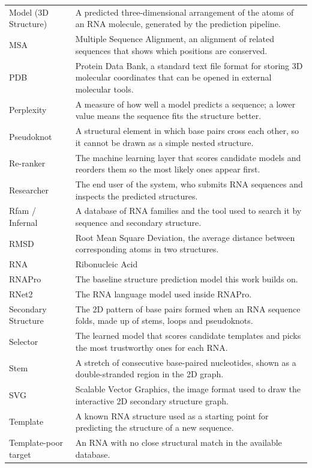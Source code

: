 \documentclass{FastFyp}
\begin{document}
\begin{longtable}{p{} p{}}
Model (3D Structure) & A predicted three-dimensional arrangement of the atoms of an RNA molecule, generated by the prediction pipeline.\\
MSA & Multiple Sequence Alignment, an alignment of related sequences that shows which positions are conserved.\\
PDB & Protein Data Bank, a standard text file format for storing 3D molecular coordinates that can be opened in external molecular tools.\\
Perplexity & A measure of how well a model predicts a sequence; a lower value means the sequence fits the structure better.\\
Pseudoknot & A structural element in which base pairs cross each other, so it cannot be drawn as a simple nested structure.\\
Re-ranker & The machine learning layer that scores candidate models and reorders them so the most likely ones appear first.\\
Researcher & The end user of the system, who submits RNA sequences and inspects the predicted structures.\\
Rfam / Infernal & A database of RNA families and the tool used to search it by sequence and secondary structure.\\
RMSD & Root Mean Square Deviation, the average distance between corresponding atoms in two structures.\\
RNA & Ribonucleic Acid\\
RNAPro & The baseline structure prediction model this work builds on.\\
RNet2 & The RNA language model used inside RNAPro.\\
Secondary Structure & The 2D pattern of base pairs formed when an RNA sequence folds, made up of stems, loops and pseudoknots.\\
Selector & The learned model that scores candidate templates and picks the most trustworthy ones for each RNA.\\
Stem & A stretch of consecutive base-paired nucleotides, shown as a double-stranded region in the 2D graph.\\
SVG & Scalable Vector Graphics, the image format used to draw the interactive 2D secondary structure graph.\\
Template & A known RNA structure used as a starting point for predicting the structure of a new sequence.\\
Template-poor target & An RNA with no close structural match in the available database.\\

\end{longtable}
\end{document}
